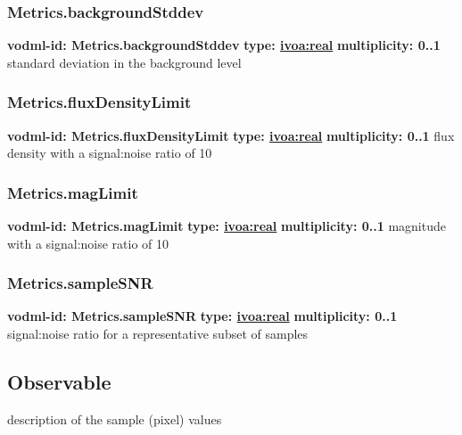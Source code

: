     \subsubsection{Metrics.backgroundStddev}
      \textbf{vodml-id: Metrics.backgroundStddev} \newline
      \textbf{type: \hyperref[sect:ivoa]{ivoa:real}} \newline
      \textbf{multiplicity: 0..1} \newline
      standard deviation in the background level

    \subsubsection{Metrics.fluxDensityLimit}
      \textbf{vodml-id: Metrics.fluxDensityLimit} \newline
      \textbf{type: \hyperref[sect:ivoa]{ivoa:real}} \newline
      \textbf{multiplicity: 0..1} \newline
      flux density with a signal:noise ratio of 10

    \subsubsection{Metrics.magLimit}
      \textbf{vodml-id: Metrics.magLimit} \newline
      \textbf{type: \hyperref[sect:ivoa]{ivoa:real}} \newline
      \textbf{multiplicity: 0..1} \newline
      magnitude with a signal:noise ratio of 10

    \subsubsection{Metrics.sampleSNR}
      \textbf{vodml-id: Metrics.sampleSNR} \newline
      \textbf{type: \hyperref[sect:ivoa]{ivoa:real}} \newline
      \textbf{multiplicity: 0..1} \newline
      signal:noise ratio for a representative subset of samples

  \subsection{Observable}
  \label{sect:Observable}
    description of the sample (pixel) values

